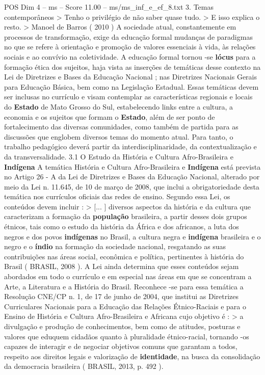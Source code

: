 \begin{textsample}{POS Dim 4 – ms – Score 11.00 – ms/ms\_inf\_e\_ef\_8.txt}  \label{ex:f4_pos_151}
3.
Temas contemporâneos > Tenho o privilégio de não saber quase tudo. > E isso explica o resto. > Manoel de Barros ( 2010 ) A sociedade atual, constantemente em processos de transformação, exige da educação formal mudanças de paradigmas no que se refere à orientação e promoção de valores essenciais à vida, às relações sociais e ao convívio na coletividade.
A educação formal tornou -se \textbf{lócus} para a formação ética dos sujeitos, haja vista as inserções de temáticas desse contexto na Lei de Diretrizes e Bases da Educação Nacional ; nas Diretrizes Nacionais Gerais para Educação Básica, bem como na Legislação Estadual.
Essas temáticas devem ser inclusas no currículo e visam contemplar as características regionais e locais do \textbf{Estado} de Mato Grosso do Sul, estabelecendo links entre a cultura, a economia e os sujeitos que formam o \textbf{Estado}, além de ser ponto de fortalecimento das diversas comunidades, como também de partida para as discussões que englobem diversos temas do momento atual.
Para tanto, o trabalho pedagógico deverá partir da interdisciplinaridade, da contextualização e da transversalidade. 3.1 O Estudo da História e Cultura Afro-Brasileira e \textbf{Indígena} A temática História e Cultura Afro-Brasileira e \textbf{Indígena} está prevista no Artigo 26 - A da Lei de Diretrizes e Bases da Educação Nacional, alterado por meio da Lei n. 11.645, de 10 de março de 2008, que inclui a obrigatoriedade desta temática nos currículos oficiais das redes de ensino.
Segundo essa Lei, os conteúdos devem incluir : > [... ] diversos aspectos da história e da cultura que caracterizam a formação da \textbf{população} brasileira, a partir desses dois grupos étnicos, tais como o estudo da história da África e dos africanos, a luta dos negros e dos povos \textbf{indígenas} no Brasil, a cultura negra e \textbf{indígena} brasileira e o negro e o \textbf{índio} na formação da sociedade nacional, resgatando as suas contribuições nas áreas social, econômica e política, pertinentes à história do Brasil ( BRASIL, 2008 ).
A Lei ainda determina que esses conteúdos sejam abordados em todo o currículo e em especial nas áreas em que se concentram a Arte, a Literatura e a História do Brasil.
Reconhece -se para essa temática a Resolução CNE/CP n. 1, de 17 de junho de 2004, que institui as Diretrizes Curriculares Nacionais para a Educação das Relações Étnico-Raciais e para o Ensino de História e Cultura Afro-Brasileira e Africana cujo objetivo é : > a divulgação e produção de conhecimentos, bem como de atitudes, posturas e valores que eduquem cidadãos quanto à pluralidade étnico-racial, tornando -os capazes de interagir e de negociar objetivos comuns que garantam a todos, respeito aos direitos legais e valorização de \textbf{identidade}, na busca da consolidação da democracia brasileira ( BRASIL, 2013, p. 492 ).

\end{textsample}
